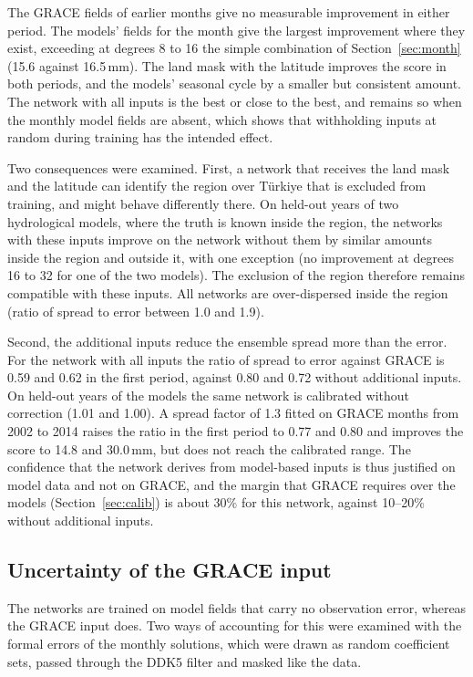 \documentclass[11pt,a4paper]{article}
\begin{document}
The GRACE fields of earlier months give no measurable improvement in either period. The
models' fields for the month give the largest improvement where they exist, exceeding at
degrees 8 to 16 the simple combination of Section~\ref{sec:month} (15.6 against 16.5\,mm). The
land mask with the latitude improves the score in both periods, and the models' seasonal cycle
by a smaller but consistent amount. The network with all inputs is the best or close to the
best, and remains so when the monthly model fields are absent, which shows that withholding
inputs at random during training has the intended effect.

Two consequences were examined. First, a network that receives the land mask and the latitude
can identify the region over Türkiye that is excluded from training, and might behave
differently there. On held-out years of two hydrological models, where the truth is known
inside the region, the networks with these inputs improve on the network without them by
similar amounts inside the region and outside it, with one exception (no improvement at
degrees 16 to 32 for one of the two models). The exclusion of the region therefore remains
compatible with these inputs. All networks are over-dispersed inside the region (ratio of
spread to error between 1.0 and 1.9).

Second, the additional inputs reduce the ensemble spread more than the error. For the network
with all inputs the ratio of spread to error against GRACE is 0.59 and 0.62 in the first
period, against 0.80 and 0.72 without additional inputs. On held-out years of the models the
same network is calibrated without correction (1.01 and 1.00). A spread factor of 1.3 fitted
on GRACE months from 2002 to 2014 raises the ratio in the first period to 0.77 and 0.80 and
improves the score to 14.8 and 30.0\,mm, but does not reach the calibrated range. The
confidence that the network derives from model-based inputs is thus justified on model data
and not on GRACE, and the margin that GRACE requires over the models (Section~\ref{sec:calib})
is about 30\% for this network, against 10--20\% without additional inputs.

\subsection{Uncertainty of the GRACE input}\label{sec:noise}
The networks are trained on model fields that carry no observation error, whereas the GRACE
input does. Two ways of accounting for this were examined with the formal errors of the
monthly solutions, which were drawn as random coefficient sets, passed through the DDK5 filter
and masked like the data.
\end{document}
